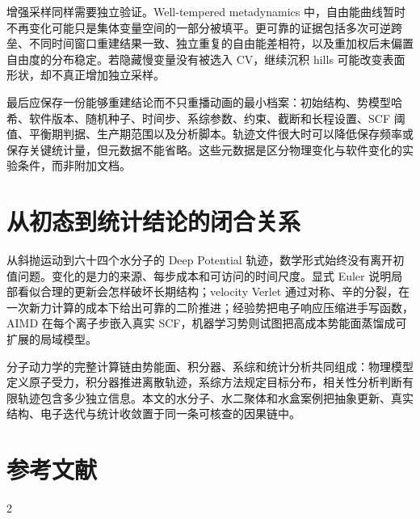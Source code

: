 \documentclass[UTF8,10pt,a4paper,fontset=none]{ctexart}
\begin{document}
增强采样同样需要独立验证。Well-tempered metadynamics 中，自由能曲线暂时不再变化可能只是集体变量空间的一部分被填平。更可靠的证据包括多次可逆跨垒、不同时间窗口重建结果一致、独立重复的自由能差相符，以及重加权后未偏置自由度的分布稳定。若隐藏慢变量没有被选入 CV，继续沉积 hills 可能改变表面形状，却不真正增加独立采样。

最后应保存一份能够重建结论而不只重播动画的最小档案：初始结构、势模型哈希、软件版本、随机种子、时间步、系综参数、约束、截断和长程设置、SCF 阈值、平衡期判据、生产期范围以及分析脚本。轨迹文件很大时可以降低保存频率或保存关键统计量，但元数据不能省略。这些元数据是区分物理变化与软件变化的实验条件，而非附加文档。

\section{从初态到统计结论的闭合关系}

从斜抛运动到六十四个水分子的 Deep Potential 轨迹，数学形式始终没有离开初值问题。变化的是力的来源、每步成本和可访问的时间尺度。显式 Euler 说明局部看似合理的更新会怎样破坏长期结构；velocity Verlet 通过对称、辛的分裂，在一次新力计算的成本下给出可靠的二阶推进；经验势把电子响应压缩进手写函数，AIMD 在每个离子步嵌入真实 SCF，机器学习势则试图把高成本势能面蒸馏成可扩展的局域模型。

分子动力学的完整计算链由势能面、积分器、系综和统计分析共同组成：物理模型定义原子受力，积分器推进离散轨迹，系综方法规定目标分布，相关性分析判断有限轨迹包含多少独立信息。本文的水分子、水二聚体和水盒案例把抽象更新、真实结构、电子迭代与统计收敛置于同一条可核查的因果链中。


\section*{参考文献}
\vspace{-7pt}
\begin{multicols}{2}
\raggedright
\raggedcolumns
\setlength{\columnsep}{10pt}
\fontsize{9}{10.5}\selectfont
\printbibliography[heading=none]
\end{multicols}
\end{document}
